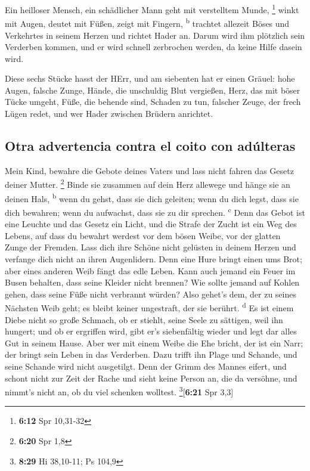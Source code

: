  Ein heilloser Mensch, ein schädlicher Mann geht mit
verstelltem Munde, \footnote{\textbf{6:12} Spr 10,31-32} 
winkt mit Augen, deutet mit Füßen, zeigt mit Fingern,
\textsuperscript{b}  trachtet allezeit Böses und
Verkehrtes in seinem Herzen und richtet Hader an.  Darum
wird ihm plötzlich sein Verderben kommen, und er wird schnell zerbrochen
werden, da keine Hilfe dasein wird.

 Diese sechs Stücke hasst der HErr, und am siebenten hat
er einen Gräuel:  hohe Augen, falsche Zunge, Hände, die
unschuldig Blut vergießen,  Herz, das mit böser Tücke
umgeht, Füße, die behende sind, Schaden zu tun,  falscher
Zeuge, der frech Lügen redet, und wer Hader zwischen Brüdern anrichtet.

\hypertarget{otra-advertencia-contra-el-coito-con-aduxfalteras}{%
\subsection{Otra advertencia contra el coito con
adúlteras}\label{otra-advertencia-contra-el-coito-con-aduxfalteras}}

 Mein Kind, bewahre die Gebote deines Vaters und lass
nicht fahren das Gesetz deiner Mutter. \footnote{\textbf{6:20} Spr 1,8}
 Binde sie zusammen auf dein Herz allewege und hänge sie
an deinen Hals, \textsuperscript{b}  wenn du gehst, dass
sie dich geleiten; wenn du dich legst, dass sie dich bewahren; wenn du
aufwachst, dass sie zu dir sprechen. \textsuperscript{c} 
Denn das Gebot ist eine Leuchte und das Gesetz ein Licht, und die Strafe
der Zucht ist ein Weg des Lebens,  auf dass du bewahrt
werdest vor dem bösen Weibe, vor der glatten Zunge der Fremden.
 Lass dich ihre Schöne nicht gelüsten in deinem Herzen
und verfange dich nicht an ihren Augenlidern.  Denn eine
Hure bringt einen ums Brot; aber eines anderen Weib fängt das edle
Leben.  Kann auch jemand ein Feuer im Busen behalten,
dass seine Kleider nicht brennen?  Wie sollte jemand auf
Kohlen gehen, dass seine Füße nicht verbrannt würden? 
Also gehet's dem, der zu seines Nächsten Weib geht; es bleibt keiner
ungestraft, der sie berührt. \textsuperscript{d}  Es ist
einem Diebe nicht so große Schmach, ob er stiehlt, seine Seele zu
sättigen, weil ihn hungert;  und ob er ergriffen wird,
gibt er's siebenfältig wieder und legt dar alles Gut in seinem Hause.
 Aber wer mit einem Weibe die Ehe bricht, der ist ein
Narr; der bringt sein Leben in das Verderben.  Dazu
trifft ihn Plage und Schande, und seine Schande wird nicht ausgetilgt.
 Denn der Grimm des Mannes eifert, und schont nicht zur
Zeit der Rache  und sieht keine Person an, die da
versöhne, und nimmt's nicht an, ob du viel schenken wolltest.
\footnote{\textbf{8:29} Hi 38,10-11; Ps 104,9}{[}\textbf{6:21} Spr
3,3{]}

